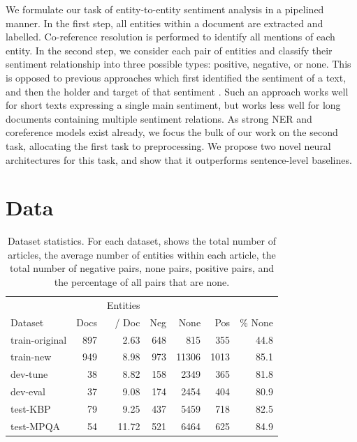 \documentclass[11pt,a4paper]{article}
\begin{document}
\par We formulate our task of entity-to-entity sentiment analysis in a pipelined manner.
In the first step, all entities within a document are extracted and labelled.
Co-reference resolution is performed to identify all mentions of each entity.
In the second step, we consider each pair of entities and classify their sentiment relationship into three possible types: positive, negative, or none.
This is opposed to previous approaches which first identified the sentiment of a text, and then the holder and target of that sentiment \citep{Kim:2006}.
Such an approach works well for short texts expressing a single main sentiment, but works less well for long documents containing multiple sentiment relations.
As strong NER and coreference \citep{Lee:17} models exist already, we focus the bulk of our work on the second task, allocating the first task to preprocessing.
We propose two novel neural architectures for this task, and show that it outperforms sentence-level baselines.

\section{Data}
\begin{table}[!t]
\centering
\begin{tabular}{| l | r | r | r | r | r | r |}
\hline
 & & Entities & & & & \\
Dataset & Docs & / Doc & Neg & None & Pos & \% None \\ \hline \hline
train-original & 897 & 2.63 & 648 & 815 & 355 & 44.8 \\
train-new & 949	 & 8.98 & 973 & 11306 & 1013 & 85.1 \\
dev-tune & 38 & 8.82 & 158 & 2349 & 365 & 81.8 \\
dev-eval& 37 & 9.08 & 174 & 2454 & 404 & 80.9 \\
test-KBP & 79 & 9.25 & 437 & 5459 & 718 & 82.5 \\
test-MPQA & 54 & 11.72 & 521 & 6464 & 625 & 84.9 \\
\hline
\end{tabular}
\caption{\label{tab:data} Dataset statistics. For each dataset, shows the total number of articles, the average number of entities within each article, the total number of negative pairs, none pairs, positive pairs, and the percentage of all pairs that are none.}
\end{table}
\end{document}
